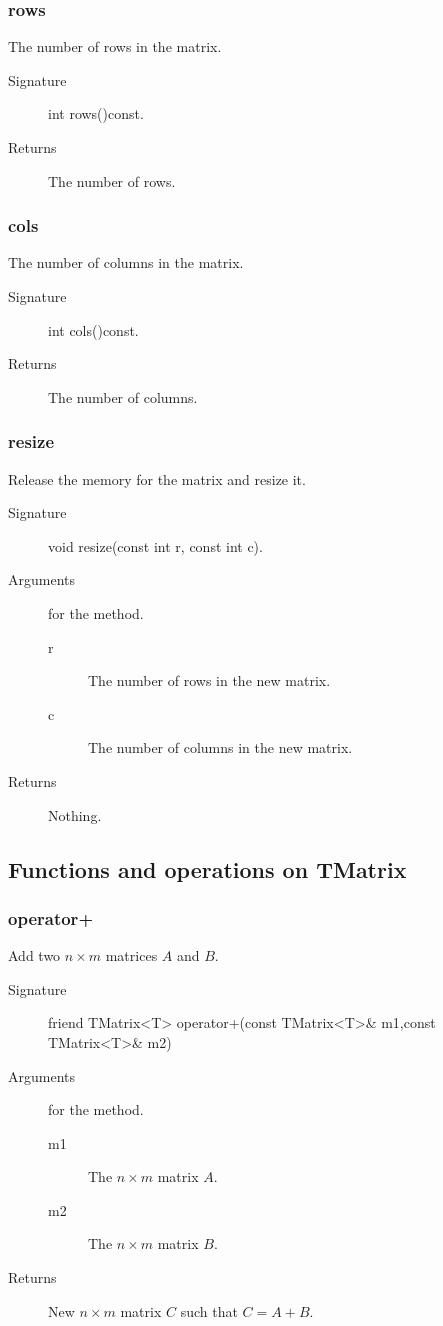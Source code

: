 \subsubsection{rows}
The number of rows in the matrix.

\begin{description}
    \item[Signature] int rows()const.
    \item[Returns] The number of rows.
\end{description}

\subsubsection{cols}
The number of columns in the matrix.

\begin{description}
   \item[Signature] int  cols()const.
   \item[Returns] The number of columns.
\end{description}

\subsubsection{resize}
Release the memory for the matrix and resize it.
\begin{description}
   \item[Signature] void resize(const int r, const int c).
   \item[Arguments] for the method.
     \begin{description}
       \item[r] The number of rows in the new matrix.
       \item[c] The number of columns in the new matrix.
     \end{description}
   \item[Returns] Nothing.
\end{description}

\subsection{Functions and operations on TMatrix}
\subsubsection{operator+}
Add two $n \times m$ matrices $A$ and $B$.
\begin{description}
   \item[Signature] friend TMatrix<T> operator+(const TMatrix<T>\& m1,const TMatrix<T>\& m2) 
  \item [Arguments] for the method.
    \begin{description}
      \item [m1] The  $n \times m$ matrix $A$.
      \item [m2] The  $n \times m$ matrix $B$.
    \end{description}
  \item [Returns] New  $n \times m$ matrix $C$ such that $C = A + B$.
\end{description}

